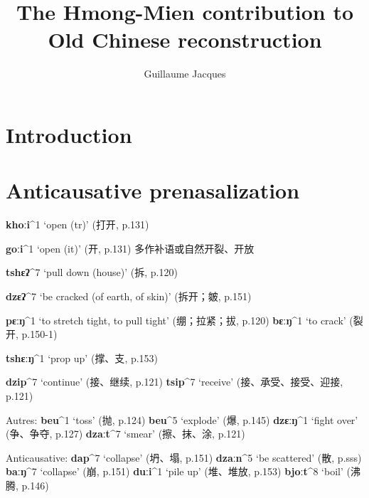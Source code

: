 \documentclass[oneside,a4paper,11pt]{article}
\newcommand{\ipa}[1]{\textbf{{\phon\mbox{#1}}}} %
\newcommand{\zh}[1]{{\cn #1}}
\newcommand{\mien}[5]{\ipa{#1}^{#2} `#3' (\zh{#4}, p.#5)}
\begin{document}
\title{The Hmong-Mien contribution to Old Chinese reconstruction}
\author{Guillaume Jacques}
\maketitle

\section*{Introduction}
\citet{sagart03prenasalized}
\citet{maozw92mien}
\citet{ratliff10protohm}
\citet{wang95protomy}
\section{Anticausative prenasalization}
\citet[14-16]{downer73loanwords}

\citet{wanglz12jieci}
 
\mien{khoːi}{1}{open (tr)}{打开}{131} 

\mien{goːi}{1}{open (it)}{开}{131}  
\zh{多作补语或自然开裂、开放}

\mien{tshɛʔ}{7}{pull down (house)}{拆}{120}
 
\mien{dzɛʔ}{7}{be cracked (of earth, of skin)}{拆开；皴}{151}

\mien{pɛːŋ}{1}{to stretch tight, to pull tight}{绷；拉紧；拔}{120}
\mien{bɛːŋ}{1}{to crack}{裂开}{150-1}



\mien{tshɛːŋ}{1}{prop up}{撑、支}{153} 

\mien{dzip}{7}{continue}{接、继续}{121}
\mien{tsip}{7}{receive}{接、承受、接受、迎接}{121}


Autres:
\mien{beu}{1}{toss}{抛}{124} 
\mien{beu}{5}{explode}{爆}{145} 
\mien{dzɛːŋ}{1}{fight over}{争、争夺}{127} 
\mien{dzaːt}{7}{smear}{擦、抹、涂}{121} 

Anticausative:
\mien{dap}{7}{collapse}{坍、塌}{151} 
\mien{dzaːn}{5}{be scattered}{散}{sss}
\mien{baːŋ}{7}{collapse}{崩}{151} 
\mien{duːi}{1}{pile up}{堆、堆放}{153} 
\mien{bjoːt}{8}{boil}{沸腾}{146} 
\end{document}

